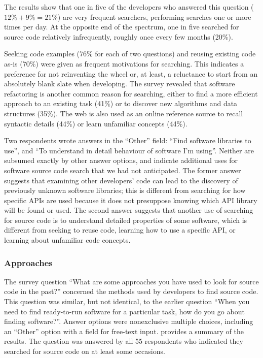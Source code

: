 \documentclass{casicswhitepaper}
\newcommand{\totalSearchers}{55\xspace}
\begin{document}
The results show that one in five of the developers who answered this question ($12\% + 9\% = 21\%$) are very frequent searchers, performing searches one or more times per day.  At the opposite end of the spectrum, one in five searched for source code relatively infrequently, roughly once every few months (20\%).

Seeking code examples (76\% for each of two questions) and reusing existing code as-is (70\%) were given as frequent motivations for searching.  This indicates a preference for not reinventing the wheel or, at least, a reluctance to start from an absolutely blank slate when developing.  The survey revealed that software refactoring is another common reason for searching, either to find a more efficient approach to an existing task (41\%) or to discover new algorithms and data structures (35\%). The web is also used as an online reference source to recall syntactic details (44\%) or learn unfamiliar concepts (44\%). %

Two respondents wrote answers in the ``Other'' field: ``Find software libraries to use'', and ``To understand in detail behaviour of software I'm using''.  Neither are subsumed exactly by other answer options, and indicate additional uses for software source code search that we had not anticipated.  The former answer suggests that examining other developers' code can lead to the discovery of previously unknown software libraries; this is different from searching for how specific APIs are used because it does not presuppose knowing which API library will be found or used.  The second answer suggests that another use of searching for source code is to understand detailed properties of some software, which is different from seeking to reuse code, learning how to use a specific API, or learning about unfamiliar code concepts.


\subsubsection{Approaches}
\label{approaches-find-src}

The survey question ``What are some approaches you have used to look for source code in the past?'' concerned the methods used by developers to find source code.  This question was similar, but not identical, to the earlier question ``When you need to find ready-to-run software for a particular task, how do you go about finding software?''.  Answer options were nonexclusive multiple choices, including an ``Other'' option with a field for free-text input.   provides a summary of the results.  The question was answered by all \totalSearchers respondents who indicated they searched for source code on at least some occasions.
\end{document}
